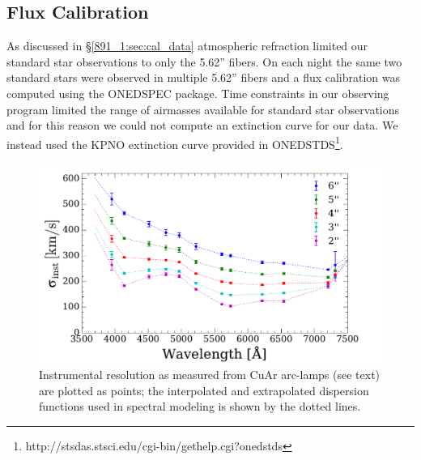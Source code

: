 \subsection{Flux Calibration}
\label{891_1:sec:flux_cal}


As discussed in \S\ref{891_1:sec:cal_data} atmospheric refraction limited
our standard star observations to only the 5.62'' fibers. On each
night the same two standard stars were observed in multiple 5.62''
fibers and a flux calibration was computed using the ONEDSPEC
package. Time constraints in our observing program limited the range
of airmasses available for standard star observations and for this
reason we could not compute an extinction curve for our data. We
instead used the KPNO extinction curve provided in
ONEDSTDS\footnote{http://stsdas.stsci.edu/cgi-bin/gethelp.cgi?onedstds}.

\begin{figure}
  \centering
  \includegraphics[width=\columnwidth]{891_1/figs/disp_paper.pdf}

  \caption{\label{fig:dispfunc}\fixspacing Instrumental resolution as
    measured from CuAr arc-lamps (see text) are plotted as points; the
    interpolated and extrapolated dispersion functions used in
    spectral modeling is shown by the dotted lines.}
\end{figure}

